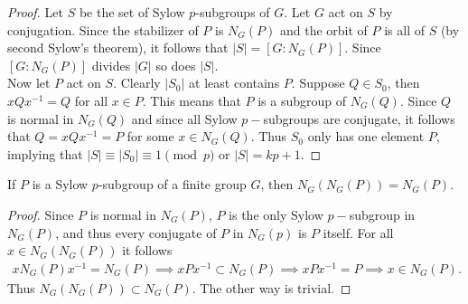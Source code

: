 \begin{proof}
  Let $S$ be the set of Sylow $p$-subgroups of $G$. Let $G$ act on $S$ by conjugation. Since the stabilizer of $P$ is $N_G(P)$ and the orbit of $P$ is all of $S$ (by second Sylow's theorem), it follows that $|S| = [G:N_G(P)]$. Since $[G:N_G(P)]$ divides $|G|$ so does $|S|$.\\ 

  Now let $P$ act on $S$. Clearly $|S_0|$ at least contains $P$. Suppose $Q\in S_0$, then $xQx^{-1} = Q$ for all $x\in P$. This means that $P$ is a subgroup of $N_G(Q)$. Since $Q$ is normal in $N_G(Q)$ and since all Sylow $p-$subgroups are conjugate, it follows that $Q = xQx^{-1} = P$ for some $x\in N_G(Q)$. Thus $S_0$ only has one element $P$, implying that $|S| \equiv |S_0| \equiv 1 \pmod{p}$ or $|S| = kp +1$.
\end{proof}
\begin{proposition}
  If $P$ is a Sylow $p$-subgroup of a finite group $G$, then $N_G(N_G(P)) =  N_G(P)$.
\end{proposition}
\begin{proof}
  Since $P$ is normal in $N_G(P)$, $P$ is the only Sylow $p-$subgroup in $N_G(P)$, and thus every conjugate of $P$ in $N_G(p)$ is $P$ itself. For all $x\in N_G(N_G(P))$ it follows
  \begin{align*}
    xN_G(P) x^{-1} = N_G(P) \implies xPx^{-1}\subset N_G(P) \implies xPx^{-1} = P \implies x\in N_G(P).
  \end{align*}
  Thus $N_G(N_G(P)) \subset N_G(P)$. The other way is trivial.
\end{proof}
